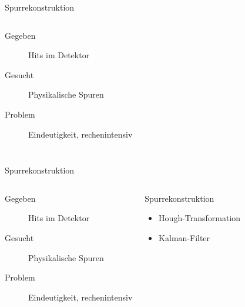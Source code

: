 

\begin{frame}{Spurrekonstruktion}
	\begin{columns}[T]
			\begin{description}
			  \item[Gegeben] Hits im Detektor
			  \item[Gesucht] Physikalische Spuren
			  \item[Problem] Eindeutigkeit, rechenintensiv
			\end{description}
			
	    	\begin{figure}[htbp]
			  \centering
			   
			\end{figure}
    \end{columns}
\end{frame}

\begin{frame}{Spurrekonstruktion}
	\begin{columns}[T]
				\begin{description}
			  \item[Gegeben] Hits im Detektor
			  \item[Gesucht] Physikalische Spuren
			  \item[Problem] Eindeutigkeit, rechenintensiv
			\end{description}
			\vspace{1cm}
				\begin{block}{Spurrekonstruktion}
		\begin{itemize}
		  \item Hough-Transformation
		  \item Kalman-Filter
		\end{itemize}
	\end{block}
	    	\begin{figure}[htbp]
			  \centering
			   
			\end{figure}
    \end{columns}
\end{frame}


% 			   
% 		
